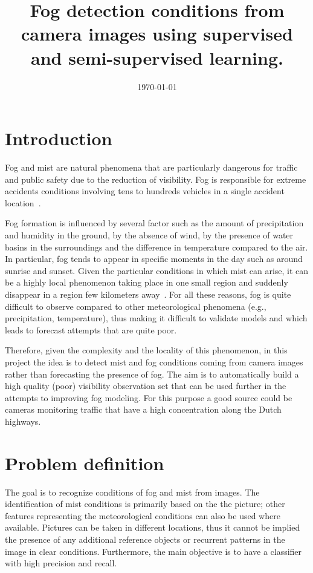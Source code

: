\documentclass[conference]{IEEEtran}
\date{\today}
\author{
	\IEEEauthorblockN{Andrea Pagani}
	\IEEEauthorblockA{De Bilt, Netherlands\\ Email: andrea.pagani@knmi.nl}}
\title{
	Fog detection conditions from camera images using supervised and semi-supervised learning.
}
\begin{document}
\maketitle
\vspace{-0.2cm}
\section{Introduction}
Fog and mist are natural phenomena that are particularly dangerous for traffic and public safety due to the reduction of visibility. Fog is responsible for extreme accidents conditions involving tens to hundreds vehicles in a single accident location~\cite{hamilton2014hidden}.
 
Fog 
formation is influenced by several factor such as the amount of precipitation and humidity in the ground, by the absence of wind, by the 
presence of water basins in the surroundings and the difference in temperature compared to the air. In particular, 
fog tends to appear in specific moments in the day such as around sunrise and sunset.
Given the particular conditions in which mist can arise, it can be a highly local phenomenon taking 
place in one small region and suddenly disappear in a region few kilometers away~\cite{gultepe2007fog}.
For all these reasons, fog is quite difficult to observe compared to other meteorological phenomena (e.g., precipitation, temperature), 
thus making it difficult to validate models and which leads to forecast attempts that are quite poor. 

Therefore, given the complexity and the locality of this phenomenon, in this project the idea is to detect mist and fog conditions coming from camera images rather than forecasting the 
presence of fog. The aim is to automatically build a high quality (poor) visibility observation set that can be used further in the attempts to improving fog modeling. For this purpose a good source could be cameras monitoring traffic that have a high concentration along the Dutch highways.
\vspace{-0.2cm}
\section{Problem definition}
The goal is to recognize conditions of fog and mist from images. The identification of mist conditions 
is primarily based on the the picture; other features representing the meteorological conditions can also be used where available. Pictures can be taken in different locations, thus it cannot be 
implied the presence of any additional reference objects or recurrent patterns in the image in clear conditions. 
Furthermore, the main objective is to have a classifier with high precision and recall.
\end{document}

